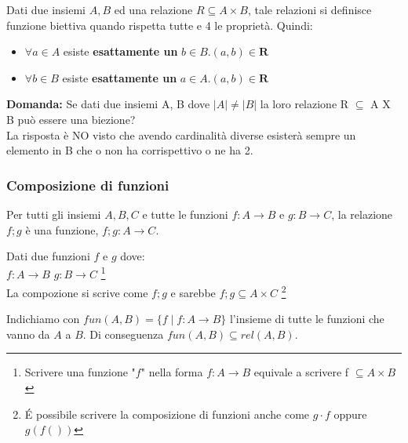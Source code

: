 \begin{definition}
	
\end{definition}

\begin{definition}[Biezione]
Dati due insiemi $A, B$ ed una relazione $R \subseteq A \times B$, tale relazioni si definisce funzione biettiva quando rispetta tutte e 4 le proprietà. Quindi:
\begin{itemize}
	\item $ \forall a \in A$ esiste \textbf{esattamente un} $b \in B . (a, b) \in \mathbf{R}$
	\item $ \forall b \in B$ esiste \textbf{esattamente un} $a \in A . (a, b) \in \mathbf{R}$
\end{itemize}
\end{definition}

\textbf{Domanda:} Se dati due insiemi A, B dove $|A| \neq |B|$ la loro relazione R $\subseteq$ A X B può essere una biezione?\\
La risposta è NO visto che avendo cardinalità diverse esisterà sempre un elemento in B che o non ha corrispettivo o ne ha 2.

\subsubsection{Composizione di funzioni}
\begin{proposition}
	Per tutti gli insiemi $A, B, C$ e tutte le funzioni $f:A\rightarrow B$ e $g:B\rightarrow C$, la relazione $f;g$ è una funzione, $f;g:A \rightarrow C$.
\end{proposition}
\begin{example}
    Dati due funzioni $f$ e $g$ dove:\\
	$f: A \rightarrow B$ \hspace{.5cm} $g: B \rightarrow C$ \footnote{Scrivere una funzione "$f$" nella forma $f: A \rightarrow B$  equivale a scrivere f $\subseteq A \times B$}\\ 
    La compozione si scrive come $f;g$ e sarebbe $f;g \subseteq A \times C$ \footnote{É possibile scrivere la composizione di funzioni anche come $g \cdot f$ oppure $g(f())$}
\end{example}
\begin{note}
	Indichiamo con $fun(A,B) = \{f \mid f: A \rightarrow B\}$ l'insieme di tutte le funzioni che vanno da $A$ a $B$. Di conseguenza $fun(A, B) \subseteq rel(A, B)$.
\end{note}

